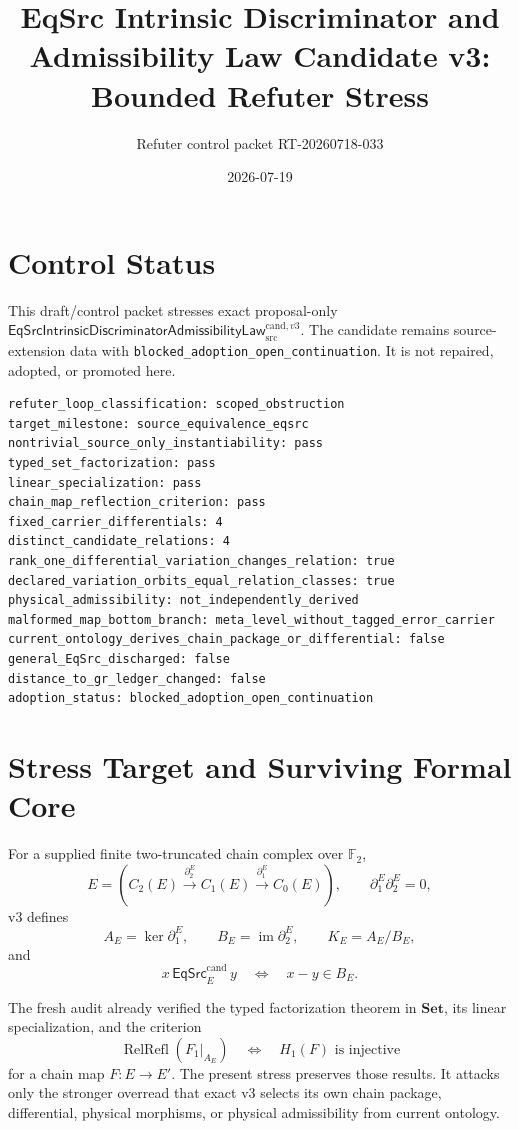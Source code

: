 \documentclass[11pt]{article}
\title{EqSrc Intrinsic Discriminator and Admissibility Law Candidate v3:\\
Bounded Refuter Stress}
\author{Refuter control packet RT-20260718-033}
\date{2026-07-19}
\newcommand{\Ftwo}{\mathbb F_2}
\newcommand{\EqCand}{\mathsf{EqSrc}^{\mathrm{cand}}}
\begin{document}
\maketitle

\section{Control Status}

This draft/control packet stresses exact proposal-only
\(\mathsf{EqSrcIntrinsicDiscriminatorAdmissibilityLaw}
_{\mathrm{src}}^{\mathrm{cand},v3}\).
The candidate remains source-extension data with
\texttt{blocked\_adoption\_open\_continuation}. It is not repaired, adopted,
or promoted here.

\begin{verbatim}
refuter_loop_classification: scoped_obstruction
target_milestone: source_equivalence_eqsrc
nontrivial_source_only_instantiability: pass
typed_set_factorization: pass
linear_specialization: pass
chain_map_reflection_criterion: pass
fixed_carrier_differentials: 4
distinct_candidate_relations: 4
rank_one_differential_variation_changes_relation: true
declared_variation_orbits_equal_relation_classes: true
physical_admissibility: not_independently_derived
malformed_map_bottom_branch: meta_level_without_tagged_error_carrier
current_ontology_derives_chain_package_or_differential: false
general_EqSrc_discharged: false
distance_to_gr_ledger_changed: false
adoption_status: blocked_adoption_open_continuation
\end{verbatim}

\section{Stress Target and Surviving Formal Core}

For a supplied finite two-truncated chain complex over \(\Ftwo\),
\[
 E=\left(C_2(E)\xrightarrow{\partial_2^E}
 C_1(E)\xrightarrow{\partial_1^E}C_0(E)\right),
 \qquad \partial_1^E\partial_2^E=0,
\]
v3 defines
\[
 A_E=\ker\partial_1^E,\qquad
 B_E=\operatorname{im}\partial_2^E,\qquad
 K_E=A_E/B_E,
\]
and
\[
 x\,\EqCand_E\,y
 \quad\Longleftrightarrow\quad x-y\in B_E.
\]

The fresh audit already verified the typed factorization theorem in
\(\mathbf{Set}\), its linear specialization, and the criterion
\[
 \operatorname{RelRefl}(F_1|_{A_E})
 \quad\Longleftrightarrow\quad H_1(F)\text{ is injective}
\]
for a chain map \(F:E\to E'\). The present stress preserves those results.
It attacks only the stronger overread that exact v3 selects its own chain
package, differential, physical morphisms, or physical admissibility from
current ontology.
\end{document}

